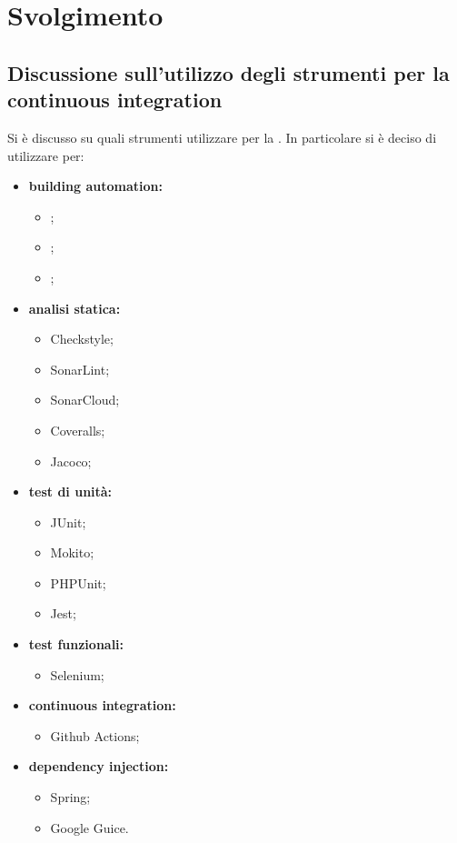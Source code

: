 \newpage
\section*{Svolgimento}

	\subsection*{Discussione sull'utilizzo degli strumenti per la continuous integration}
		Si è discusso su quali strumenti utilizzare per la . In particolare si è deciso di utilizzare per:
		\begin{itemize}
			\item \textbf{building automation:}
				\begin{itemize}
					\item {};
					\item {};
					\item {};
				\end{itemize}
			\item \textbf{analisi statica:}
				\begin{itemize}
					\item Checkstyle;
					\item SonarLint;
					\item SonarCloud;
					\item Coveralls;
					\item Jacoco;
				\end{itemize}
			\item \textbf{test di unità:}
				\begin{itemize}
					\item JUnit;
					\item Mokito;
					\item PHPUnit;
					\item Jest;
				\end{itemize}
			\item \textbf{test funzionali:}
				\begin{itemize}
					\item Selenium;
				\end{itemize}
			\item \textbf{continuous integration:}
				\begin{itemize}
					\item Github Actions;
				\end{itemize}
			\item \textbf{dependency injection:}
				\begin{itemize}
					\item Spring;
					\item Google Guice.
				\end{itemize}
		\end{itemize}

